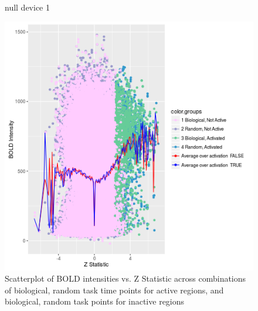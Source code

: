 \documentclass{report}
\begin{document}
\begin{figure}

\caption{Scatterplot of BOLD intensities vs. Z Statistic across combinations of biological, random task time points for active regions, and biological, random task points for inactive regions}
\label{fig:figure1}

\begin{Schunk}
\begin{Soutput}
null device 
          1 
\end{Soutput}
\end{Schunk}
\includegraphics{fig1}

\end{figure}
\end{document}

